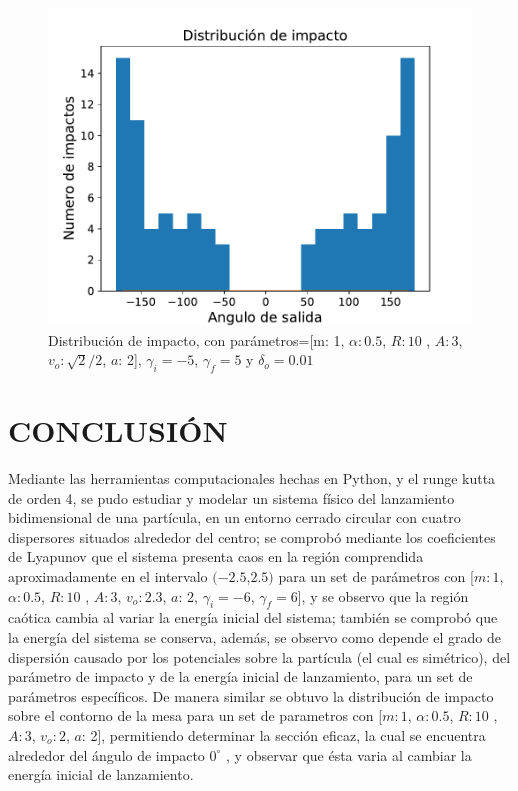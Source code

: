 \documentclass[11pt,letterpaper,twocolumn]{article}
\begin{document}
\begin{figure}[H]
\centering 
\includegraphics[scale=0.55]{g14.pdf}
\caption{Distribución de impacto, con parámetros=[m: 1, $\alpha: 0$.$5$, $R: 10$ , $A: 3$, $ v_{o}: \sqrt{2}/2$, $a$: 2], $\gamma_{i}=-5$, $\gamma_{f}=5$ y $\delta_{o}=0.01$}
\label{ul}
\end{figure}

\section*{\normalsize{CONCLUSIÓN}}
Mediante las herramientas computacionales hechas en Python, y el runge kutta de orden 4, se pudo estudiar y modelar un sistema físico del lanzamiento bidimensional de una partícula, en un entorno cerrado circular con cuatro dispersores situados alrededor del centro; se comprobó mediante los coeficientes de Lyapunov que el sistema presenta caos en la región comprendida aproximadamente en el intervalo $(-2$.$5$,$2$.$5)$ para un set de parámetros con [$m: 1$, $\alpha: 0$.$5$, $R: 10$ , $A: 3$, $ v_{o}: 2$.$3$, $a$: 2, $\gamma_{i}=-6$, $\gamma_{f}=6$], y se observo que la región caótica cambia al variar la energía inicial del sistema; también se comprobó que la energía del sistema se conserva, además, se observo como depende el grado de dispersión causado por los potenciales sobre la partícula (el cual es simétrico), del parámetro de impacto y de la energía inicial de lanzamiento, para un set de parámetros específicos. De manera similar se obtuvo la distribución de impacto sobre el contorno de la mesa para un set de parametros con [$m:1$, $\alpha: 0$.$5$, $R: 10$ , $A: 3$, $ v_{o}:2$, $a$: 2], permitiendo determinar la sección eficaz, la cual se encuentra alrededor del ángulo de impacto $0^{\circ}$ , y observar que ésta varia al cambiar la energía inicial de lanzamiento.
\end{document}
